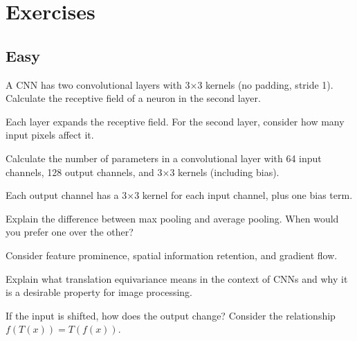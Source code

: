 
\section*{Exercises}

\subsection*{Easy}

\begin{exercisebox}[easy]
\begin{problem}
A CNN has two convolutional layers with 3×3 kernels (no padding, stride 1). Calculate the receptive field of a neuron in the second layer.
\end{problem}
\begin{hintbox}
Each layer expands the receptive field. For the second layer, consider how many input pixels affect it.
\end{hintbox}
\end{exercisebox}


\begin{exercisebox}[easy]
\begin{problem}
Calculate the number of parameters in a convolutional layer with 64 input channels, 128 output channels, and 3×3 kernels (including bias).
\end{problem}
\begin{hintbox}
Each output channel has a 3×3 kernel for each input channel, plus one bias term.
\end{hintbox}
\end{exercisebox}


\begin{exercisebox}[easy]
\begin{problem}
Explain the difference between max pooling and average pooling. When would you prefer one over the other?
\end{problem}
\begin{hintbox}
Consider feature prominence, spatial information retention, and gradient flow.
\end{hintbox}
\end{exercisebox}


\begin{exercisebox}[easy]
\begin{problem}
Explain what translation equivariance means in the context of CNNs and why it is a desirable property for image processing.
\end{problem}
\begin{hintbox}
If the input is shifted, how does the output change? Consider the relationship $f(T(x)) = T(f(x))$.
\end{hintbox}
\end{exercisebox}


